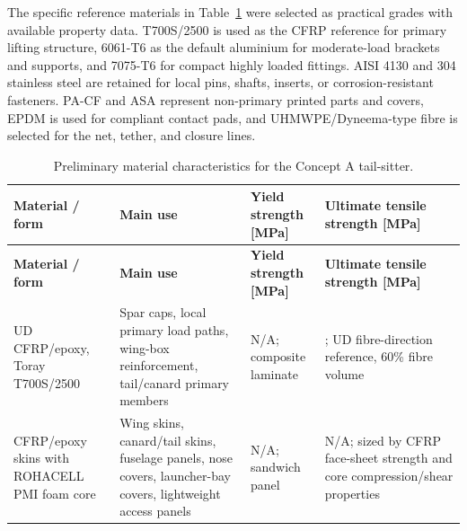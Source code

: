 The specific reference materials in Table~\ref{tab:material_characteristics_conceptA} were selected as practical grades with available property data. T700S/2500 is used as the CFRP reference for primary lifting structure, 6061-T6 as the default aluminium for moderate-load brackets and supports, and 7075-T6 for compact highly loaded fittings. AISI 4130 and 304 stainless steel are retained for local pins, shafts, inserts, or corrosion-resistant fasteners. PA-CF and ASA represent non-primary printed parts and covers, EPDM is used for compliant contact pads, and UHMWPE/Dyneema-type fibre is selected for the net, tether, and closure lines.
\\






{
\footnotesize
\renewcommand{\arraystretch}{0.88}
\setlength{\tabcolsep}{1.5pt}
\setlength{\LTleft}{0pt}
\setlength{\LTright}{0pt}
\setlength{\LTpre}{0pt}
\setlength{\LTpost}{0pt}
\setlength{\aboverulesep}{0.25ex}
\setlength{\belowrulesep}{0.25ex}
\setlength{\extrarowheight}{0pt}
\linespread{0.92}\selectfont
\begin{longtable}{@{}
>{\raggedright\arraybackslash}p{}
>{\raggedright\arraybackslash}p{}
>{\raggedright\arraybackslash}p{}
>{\raggedright\arraybackslash}p{}
@{}}
\caption{Preliminary material characteristics for the Concept A tail-sitter.}
\label{tab:material_characteristics_conceptA} \\
\toprule
\textbf{Material / form}
& \textbf{Main use}
& \textbf{Yield strength [MPa]}
& \textbf{Ultimate tensile strength [MPa]} \\
\midrule
\endfirsthead

\toprule
\textbf{Material / form}
& \textbf{Main use}
& \textbf{Yield strength [MPa]}
& \textbf{Ultimate tensile strength [MPa]} \\
\midrule
\endhead

\bottomrule
\endfoot

UD CFRP/epoxy, Toray T700S/2500 \cite{toray_t700s_2024}
& Spar caps, local primary load paths, wing-box reinforcement, tail/canard primary members
& N/A; composite laminate
& 2550; UD fibre-direction reference, 60\% fibre volume \\

CFRP/epoxy skins with ROHACELL PMI foam core \cite{toray_t700s_2024, evonik_rohacell}
& Wing skins, canard/tail skins, fuselage panels, nose covers, launcher-bay covers, lightweight access panels
& N/A; sandwich panel
& N/A; sized by CFRP face-sheet strength and core compression/shear properties \\


\end{longtable}}
